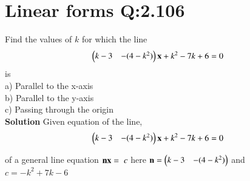 \documentclass[journal,12pt,twocolumn]{IEEEtran}
\begin{document}
\section{Linear forms Q:2.106} \text Find the values of $k$ for which the line
\begin{align}
\myvec{k-3 & -(4-k^2)}\vec{x}+k^2-7k+6=0
\end{align}
is\\
a) Parallel to the x-axis\\
b) Parallel to the y-axis\\
c) Passing through the origin\\
%
\vskip 0.5cm
\textbf{Solution} Given equation of the line, 
\begin{align}
\myvec{k-3 & -(4-k^2)}\vec{x}+k^2-7k+6=0\label{eq:1}
\end{align}
\begin{center}
 \begin{sloppypar}of a general line equation ${\vec{nx = }\hspace{2mm}c}$\newline
here ${\vec{n}=\myvec{k-3 & -(4-k^2)}}$\newline
and\hspace{4mm} ${c = -k^2+7k-6}$\end{sloppypar}\end{center}
\end{document}
